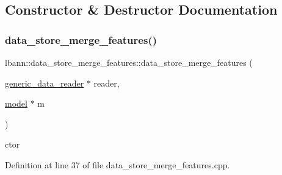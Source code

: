 \subsection{Constructor \& Destructor Documentation}
\mbox{\label{classlbann_1_1data__store__merge__features_a4a2d9d0460f657a38397cf3a48c4d83e}} 
\subsubsection{\texorpdfstring{data\+\_\+store\+\_\+merge\+\_\+features()}{data\_store\_merge\_features()}\hspace{0.1cm}{\footnotesize\ttfamily [1/2]}}
{\footnotesize\ttfamily lbann\+::data\+\_\+store\+\_\+merge\+\_\+features\+::data\+\_\+store\+\_\+merge\+\_\+features (\begin{DoxyParamCaption}\item[{\hyperlink{classlbann_1_1generic__data__reader}{generic\+\_\+data\+\_\+reader} $\ast$}]{reader,  }\item[{\hyperlink{classlbann_1_1model}{model} $\ast$}]{m }\end{DoxyParamCaption})}



ctor 



Definition at line 37 of file data\+\_\+store\+\_\+merge\+\_\+features.\+cpp.



